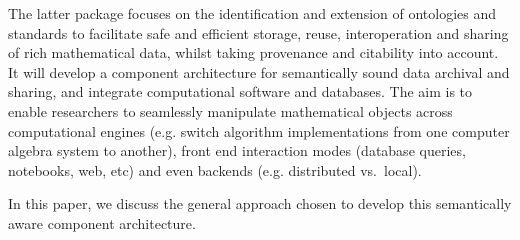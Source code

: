 The latter package focuses on the identification and extension of ontologies and standards to facilitate safe and efficient storage, reuse, interoperation and sharing of rich mathematical data, whilst taking provenance and citability into account. It will develop a component architecture for semantically sound data archival and sharing, and integrate computational software and databases. The aim is to  enable researchers to seamlessly manipulate mathematical objects across computational engines (e.g. switch algorithm implementations from one computer algebra system to another), front end interaction modes (database queries, notebooks, web, etc) and even backends (e.g. distributed vs.~local).

In this paper, we discuss the general approach chosen to develop this semantically aware component architecture. 



